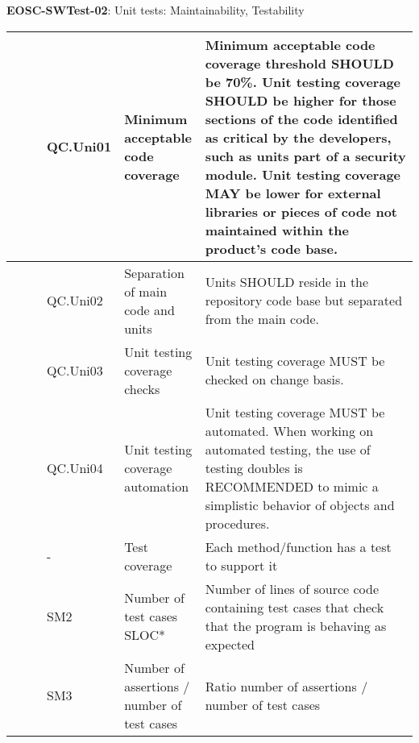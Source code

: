 \textbf{EOSC-SWTest-02}: Unit tests: Maintainability, Testability
\nopagebreak[4]
\begin{center}
    \tabletail{\hline}
    \tiny
    \begin{supertabular}{|p{0.10\linewidth}|p{0.10\linewidth}|p{0.20\linewidth}|p{0.60\linewidth}|} \hline
        \cite{orviz_set_2017} & QC.Uni01 & Minimum acceptable code coverage & Minimum acceptable code coverage threshold SHOULD be 70\%. Unit testing coverage SHOULD be higher for those sections of the code identified as critical by the developers, such as units part of a security module. Unit testing coverage MAY be lower for external libraries or pieces of code not maintained within the product's code base.\\ \hline
        \cite{orviz_set_2017} & QC.Uni02 & Separation of main code and units & Units SHOULD reside in the repository code base but separated from the main code.\\ \hline
        \cite{orviz_set_2017} & QC.Uni03 & Unit testing coverage checks & Unit testing coverage MUST be checked on change basis.\\ \hline
        \cite{orviz_set_2017} & QC.Uni04 & Unit testing coverage automation & Unit testing coverage MUST be automated. When working on automated testing, the use of testing doubles is RECOMMENDED to mimic a simplistic behavior of objects and procedures.\\ \hline
        \cite{aberdour_achieving_2007} & - & Test coverage & Each method/function has a test to support it\\ \hline
        \cite{nagappan_early_2005} & SM2 & Number of test cases SLOC* & Number of lines of source code containing test cases that check that the program is behaving as expected\\ \hline
        \cite{nagappan_early_2005} & SM3 & Number of assertions / number of test cases & Ratio number of assertions / number of test cases\\ \hline
    \end{supertabular}
\end{center}

